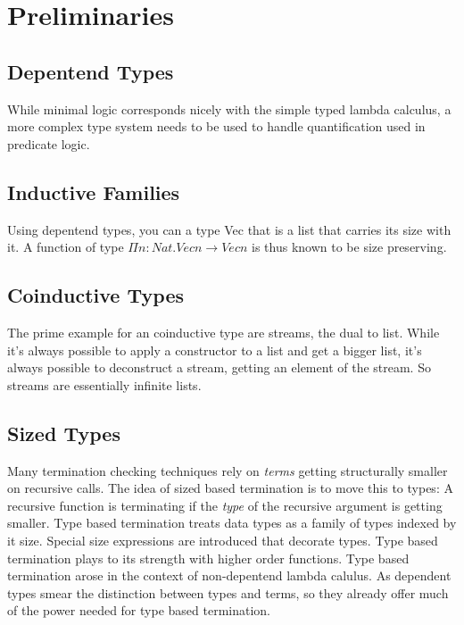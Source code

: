 \chapter{Preliminaries}

\section{Depentend Types}
While minimal logic corresponds nicely with the simple typed lambda calculus,
a more complex type system needs to be used to handle quantification used in predicate logic.

\section{Inductive Families}

Using depentend types, you can a type Vec that is a list that carries its size with it.
A function of type \(\Pi n : Nat . Vec n \rightarrow Vec n \) is thus known to be size preserving. 
\section{Coinductive Types}

The prime example for an coinductive type are streams, the dual to list.
While it's always possible to apply a constructor to a list and get a bigger list, it's always
possible to deconstruct a stream, getting an element of the stream.
So streams are essentially infinite lists.  

\section{Sized Types}

Many termination checking techniques rely on \emph{terms} getting structurally smaller on recursive calls.
The idea of sized based termination \cite{abel:PhD} is to move this to types:
A recursive function is terminating if the \emph{type} of the recursive argument is getting smaller.
Type based termination treats data types as a family of types indexed by it size.
Special size expressions are introduced that decorate types.
Type based termination plays to its strength with higher order functions. 
Type based termination arose in the context of non-depentend lambda calulus.
As dependent types smear the distinction between types and terms, so they already offer much of the power needed for type based termination.